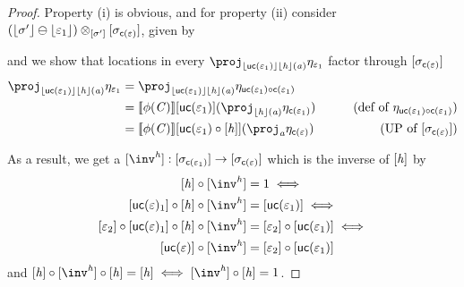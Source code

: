 \begin{proof}
    Property (i) is obvious, and for property (ii) consider $(\lfloor\sigma'\rfloor \ominus \lfloor\varepsilon_1\rfloor) \otimes_{[\sigma']} [\sigma_{\mathsf{c}(\varepsilon)}]$, given by 
    \begin{center}
    \end{center}
    and we show that locations in every $\proj_{\concL{\uncon{\me_1}}\concL\vh(\va)} \mvarM_{\me_1}$ factor through $[\sigma_{\mathsf{c}(\varepsilon)}]$ 
    \begin{align*}
        \proj_{\concL{\uncon{\me_1}}\concL\vh(\va)} \mvarM_{\me_1} & = \proj_{\concL{\uncon{\me_1}}\concL\vh(\va)} \mvarM_{\uncon{\me_1} \comp \con{\me_1}} \\
                                                                    & = \sem{\phi(\vC)}\anyL{\uncon{\me_1}}(\proj_{\concL\vh(\va)} \mvarM_{\con{\me_1}}) & \tag{def of $\mvarM_{\uncon{\me_1} \comp \con{\me_1}}$}\\
                                                                    & = \sem{\phi(\vC)}\anyL{\uncon{\me_1} \comp \anyL\vh}(\proj_\va \mvarM_{\con\me}) & \tag{UP of $\anyL{\sigma_{\con\me}}$}
    \end{align*}

    As a result, we get a $\anyL{\inv^\vh} : \anyL{\sigma_{\con{\me_1}}} \to \anyL{\sigma_{\con\me}}$ which is the inverse of $[\mathit{h}]$ by
    \begin{align*}
        \anyL\vh \comp \anyL{\inv^\vh} & = 1 \iff \\
        \anyL{\uncon\me_1} \comp \anyL\vh \comp \anyL{\inv^\vh} & = \anyL{\uncon{\me_1}} \iff \\
        \anyL{\me_2} \comp \anyL{\uncon\me_1} \comp \anyL\vh \comp \anyL{\inv^\vh} & = \anyL{\me_2} \comp \anyL{\uncon{\me_1}} \iff \\
        \anyL{\uncon\me} \comp \anyL{\inv^\vh} & = \anyL{\me_2} \comp \anyL{\uncon{\me_1}}
    \end{align*}
    and $\anyL\vh \comp \anyL{\inv^\vh} \comp \anyL\vh = \anyL\vh \iff \anyL{\inv^\vh} \comp \anyL\vh = 1$.


\end{proof}
